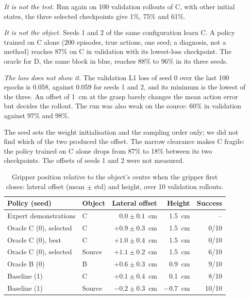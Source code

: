 \documentclass{article}
\begin{document}
\emph{It is not the test.} Run again on 100 validation rollouts of C, with other initial
states, the three selected checkpoints give 1\%, 75\% and 61\%.

\emph{It is not the object.} Seeds 1 and 2 of the same configuration learn C. A policy
trained on C alone (200 episodes, true actions, one seed; a diagnosis, not a method)
reaches 87\% on C in validation with its lowest-loss checkpoint. The oracle for D, the
same block in blue, reaches 88\% to 96\% in its three seeds.

\emph{The loss does not show it.} The validation L1 loss of seed 0 over the last 100
epochs is 0.058, against 0.059 for seeds 1 and 2, and its minimum is the lowest of the
three. An offset of 1~cm at the grasp barely changes the mean action error but decides the
rollout. The run was also weak on the source: 60\% in validation against 97\% and 98\%.

The seed sets the weight initialisation and the sampling order only; we did not find which
of the two produced the offset. The narrow clearance makes C fragile: the policy trained
on C alone drops from 87\% to 18\% between its two checkpoints. The offsets of seeds 1 and
2 were not measured.

\begin{table}[t]
  \caption{Gripper position relative to the object's centre when the gripper first
  closes: lateral offset (mean $\pm$ std) and height, over 10 validation rollouts.}
  \label{tab:offset}
  \centering
  \small
  \begin{tabular}{@{}llrrr@{}}
    \toprule
    Policy (seed) & Object & Lateral offset & Height & Success \\
    \midrule
    Expert demonstrations & C & $0.0 \pm 0.1$~cm & 1.5~cm & -- \\
    Oracle C (0), selected & C & $+0.9 \pm 0.3$~cm & 1.5~cm & 0/10 \\
    Oracle C (0), best & C & $+1.0 \pm 0.4$~cm & 1.5~cm & 0/10 \\
    Oracle C (0), selected & Source & $+1.1 \pm 0.2$~cm & 1.5~cm & 6/10 \\
    Oracle B (0) & B & $+0.6 \pm 0.3$~cm & 0.9~cm & 9/10 \\
    Baseline (1) & C & $+0.1 \pm 0.4$~cm & 0.1~cm & 8/10 \\
    Baseline (1) & Source & $-0.2 \pm 0.3$~cm & $-0.7$~cm & 10/10 \\
    \bottomrule
  \end{tabular}
\end{table}
\end{document}
